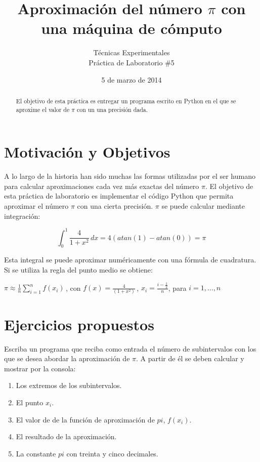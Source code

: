 \documentclass[spanish,a4paper,10pt]{article}
\begin{document}
\title{Aproximación del número $\pi$ con una máquina de cómputo}
\author{Técnicas Experimentales \\ Práctica de Laboratorio \#5}
\date{5 de marzo de 2014}

\maketitle

\begin{abstract}
El objetivo de esta práctica es entregar un programa escrito en \textsf{Python}
en el que se aproxime el valor de $\pi$ con un una precisión dada. 
\end{abstract}

\section{Motivación y Objetivos}

A lo largo de la historia han sido muchas las formas utilizadas por el 
ser humano para calcular aproximaciones cada vez más exactas del número $\pi$.
%
El objetivo de esta práctica de laboratorio es implementar el código \textsf{Python}
que permita a\-pro\-xi\-mar el número $\pi$ con una cierta precisión. 
%
$\pi$ se puede calcular mediante integración:

$$\int_{0}^{1} \! \frac{4}{1+x^2}\, dx = 4(atan(1) -atan(0)) = \pi $$

Esta integral se puede aproximar numéricamente con una fórmula de cuadratura.
%
Si se utiliza la regla del punto medio se obtiene:

\begin{center}
$ \pi \approx \frac{1}{n} \sum\limits_{i=1}^{n}f(x_i)\,$, 
con $f(x) = \frac{4}{(1+x^2)}\,$,
$x_i = \frac{i - \frac{1}{2}}{n}$,
para $i = 1, \dots, n$
\end{center}

\section{Ejercicios propuestos}

Escriba un programa que reciba como entrada el número de subintervalos 
con los que se desea abordar la aproximación de $\pi$.
%
A partir de él se deben calcular y mostrar por la consola:

\begin{enumerate}
  \item
    Los extremos de los subintervalos. 
  \item
    El punto $x_i$. 
  \item
    El valor de de la función de aproximación de $pi$, $f(x_i)$.
  \item
    El resultado de la aproximación.
  \item
    La constante $pi$ con treinta y cinco decimales.
\end{enumerate}
\end{document}
